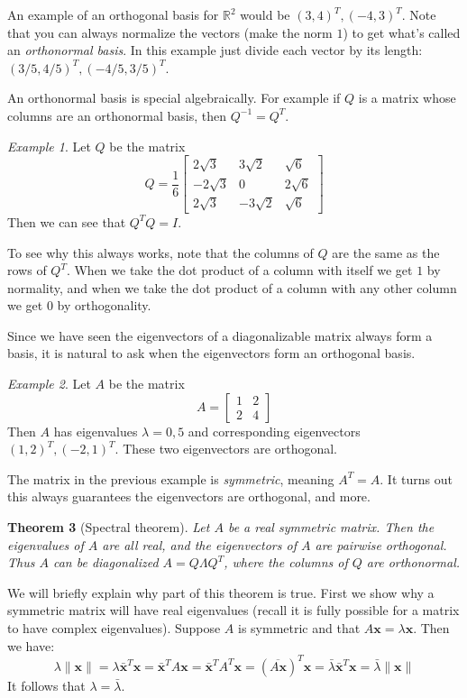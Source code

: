 \documentclass[11pt,oneside]{amsbook}
\newcommand{\R}{\mathbb R}
\theoremstyle{definition}
\theoremstyle{plain}
\newtheorem{theorem}{Theorem}[section]
\theoremstyle{definition}
\theoremstyle{remark}
\newtheorem{example}[theorem]{Example}
\numberwithin{equation}{section}
\numberwithin{figure}{section}
\begin{document}
An example of an orthogonal basis for $\R^2$ would be $(3,4)^T,(-4,3)^T$. Note that you can always normalize the vectors (make the norm $1$) to get what's called an \emph{orthonormal basis}. In this example just divide each vector by its length: $(3/5,4/5)^T,(-4/5,3/5)^T$.

An orthonormal basis is special algebraically. For example if $Q$ is a matrix  whose columns are an orthonormal basis, then $Q^{-1}=Q^T$.

\begin{example}
  Let $Q$ be the matrix
  \[Q=\frac16\begin{bmatrix}
    2\sqrt{3}&3\sqrt{2}&\sqrt{6}\\
    -2\sqrt{3}&0&2\sqrt{6}\\
    2\sqrt{3}&-3\sqrt{2}&\sqrt{6}
  \end{bmatrix}
  \]
  Then we can see that $Q^TQ=I$.
\end{example}

To see why this always works, note that the columns of $Q$ are the same as the rows of $Q^T$. When we take the dot product of a column with itself we get $1$ by normality, and when we take the dot product of a column with any other column we get $0$ by orthogonality.

Since we have seen the eigenvectors of a diagonalizable matrix always form a basis, it is natural to ask when the eigenvectors form an orthogonal basis.

\begin{example}
  Let $A$ be the matrix
  \[A=\begin{bmatrix}1&2\\2&4\end{bmatrix}
  \]
  Then $A$ has eigenvalues $\lambda=0,5$ and corresponding eigenvectors $(1,2)^T,(-2,1)^T$. These two eigenvectors are orthogonal.
\end{example}

The matrix in the previous example is \emph{symmetric}, meaning $A^T=A$. It turns out this always guarantees the eigenvectors are orthogonal, and more.

\begin{theorem}[Spectral theorem]
  Let $A$ be a real symmetric matrix. Then the eigenvalues of $A$ are all real, and the eigenvectors of $A$ are pairwise orthogonal. Thus $A$ can be diagonalized $A=Q\Lambda Q^T$, where the columns of $Q$ are orthonormal.
\end{theorem}

We will briefly explain why part of this theorem is true. First we show why a symmetric matrix will have real eigenvalues (recall it is fully possible for a matrix to have complex eigenvalues). Suppose $A$ is symmetric and that $A\mathbf{x}=\lambda\mathbf{x}$. Then we have:
\[\lambda\|\mathbf{x}\|=\lambda \bar{\mathbf{x}}^T\mathbf{x}
  =\bar{\mathbf{x}}^TA\mathbf{x}
  =\bar{\mathbf{x}}^TA^T\mathbf{x}
  =(\overline{A\mathbf{x}})^T\mathbf{x}
  =\bar\lambda\bar{\mathbf{x}}^T\mathbf{x}
  =\bar\lambda\|\mathbf{x}\|
\]
It follows that $\lambda=\bar\lambda$.
\end{document}
